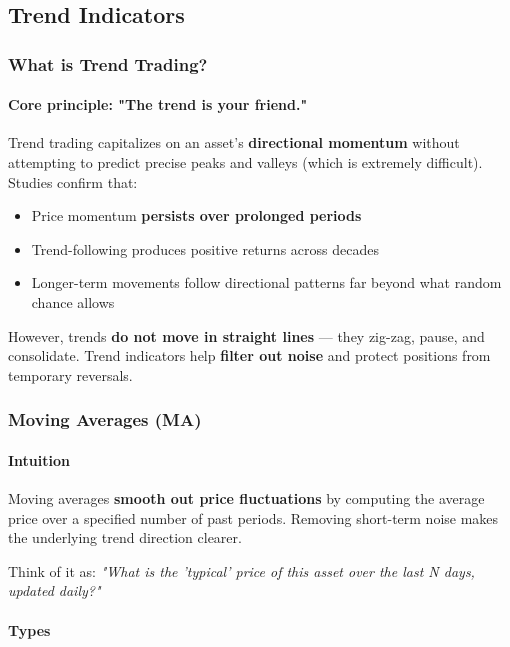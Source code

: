 \documentclass[12pt,openany]{book}
\begin{document}
\subsection{Trend Indicators}

\subsubsection{What is Trend Trading?}

\paragraph{Core principle: "The trend is your friend."}

Trend trading capitalizes on an asset's \textbf{directional momentum} without attempting to predict precise peaks and valleys (which is extremely difficult). Studies confirm that:
\begin{itemize}[leftmargin=*]
    \item Price momentum \textbf{persists over prolonged periods}
    \item Trend-following produces positive returns across decades
    \item Longer-term movements follow directional patterns far beyond what random chance allows
\end{itemize}

However, trends \textbf{do not move in straight lines} --- they zig-zag, pause, and consolidate. Trend indicators help \textbf{filter out noise} and protect positions from temporary reversals.

\subsubsection{Moving Averages (MA)}

\paragraph{Intuition}
Moving averages \textbf{smooth out price fluctuations} by computing the average price over a specified number of past periods. Removing short-term noise makes the underlying trend direction clearer.

Think of it as: \emph{"What is the 'typical' price of this asset over the last N days, updated daily?"}

\paragraph{Types}
\end{document}
